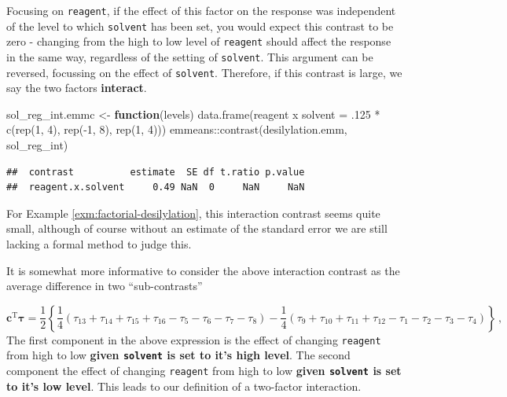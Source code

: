 \documentclass[
]{book}
\newenvironment{Shaded}{\begin{snugshade}}{\end{snugshade}}
\newcommand{\ControlFlowTok}[1]{\textcolor[rgb]{0.13,0.29,0.53}{\textbf{#1}}}
\newcommand{\DecValTok}[1]{\textcolor[rgb]{0.00,0.00,0.81}{#1}}
\newcommand{\FunctionTok}[1]{\textcolor[rgb]{0.00,0.00,0.00}{#1}}
\newcommand{\NormalTok}[1]{#1}
\newcommand{\OtherTok}[1]{\textcolor[rgb]{0.56,0.35,0.01}{#1}}
\newcommand{\SpecialCharTok}[1]{\textcolor[rgb]{0.00,0.00,0.00}{#1}}
\newcommand{\StringTok}[1]{\textcolor[rgb]{0.31,0.60,0.02}{#1}}
\theoremstyle{definition}
\theoremstyle{definition}
\theoremstyle{definition}
\theoremstyle{definition}
\theoremstyle{remark}
\begin{document}
Focusing on \texttt{reagent}, if the effect of this factor on the response was independent of the level to which \texttt{solvent} has been set, you would expect this contrast to be zero - changing from the high to low level of \texttt{reagent} should affect the response in the same way, regardless of the setting of \texttt{solvent}. This argument can be reversed, focussing on the effect of \texttt{solvent}. Therefore, if this contrast is large, we say the two factors \textbf{interact}.

\begin{Shaded}
\begin{Highlighting}[]
\NormalTok{sol\_reg\_int.emmc }\OtherTok{\textless{}{-}} \ControlFlowTok{function}\NormalTok{(levels) }
  \FunctionTok{data.frame}\NormalTok{(}\StringTok{\textquotesingle{}reagent x solvent\textquotesingle{}} \OtherTok{=}\NormalTok{ .}\DecValTok{125} \SpecialCharTok{*} \FunctionTok{c}\NormalTok{(}\FunctionTok{rep}\NormalTok{(}\DecValTok{1}\NormalTok{, }\DecValTok{4}\NormalTok{), }\FunctionTok{rep}\NormalTok{(}\SpecialCharTok{{-}}\DecValTok{1}\NormalTok{, }\DecValTok{8}\NormalTok{), }\FunctionTok{rep}\NormalTok{(}\DecValTok{1}\NormalTok{, }\DecValTok{4}\NormalTok{)))}
\NormalTok{emmeans}\SpecialCharTok{::}\FunctionTok{contrast}\NormalTok{(desilylation.emm, }\StringTok{\textquotesingle{}sol\_reg\_int\textquotesingle{}}\NormalTok{)}
\end{Highlighting}
\end{Shaded}

\begin{verbatim}
##  contrast          estimate  SE df t.ratio p.value
##  reagent.x.solvent     0.49 NaN  0     NaN     NaN
\end{verbatim}

For Example \ref{exm:factorial-desilylation}, this interaction contrast seems quite small, although of course without an estimate of the standard error we are still lacking a formal method to judge this.

It is somewhat more informative to consider the above interaction contrast as the average difference in two ``sub-contrasts''

\[
\boldsymbol{c}^{\mathrm{T}}\boldsymbol{\tau} = \frac{1}{2}\left\{\frac{1}{4}\left(\tau_{13} + \tau_{14} + \tau_{15} + \tau_{16} - \tau_5 - \tau_6 - \tau_7 - \tau_8\right)
- \frac{1}{4}\left(\tau_9 + \tau_{10} + \tau_{11} + \tau_{12} - \tau_1 - \tau_2 - \tau_3 - \tau_4\right) \right\}\,,
\]
The first component in the above expression is the effect of changing \texttt{reagent} from high to low \textbf{given \texttt{solvent} is set to it's high level}. The second component the effect of changing \texttt{reagent} from high to low \textbf{given \texttt{solvent} is set to it's low level}. This leads to our definition of a two-factor interaction.
\end{document}
